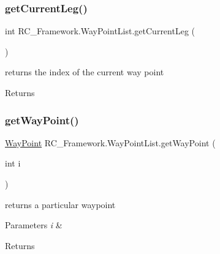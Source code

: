 \subsubsection{\texorpdfstring{get\+Current\+Leg()}{getCurrentLeg()}}
{\footnotesize\ttfamily int R\+C\+\_\+\+Framework.\+Way\+Point\+List.\+get\+Current\+Leg (\begin{DoxyParamCaption}{ }\end{DoxyParamCaption})}



returns the index of the current way point 

\begin{DoxyReturn}{Returns}

\end{DoxyReturn}
\mbox{\label{class_r_c___framework_1_1_way_point_list_aefb59feb76973b2a903d342618350896}} 
\subsubsection{\texorpdfstring{get\+Way\+Point()}{getWayPoint()}}
{\footnotesize\ttfamily \mbox{\hyperlink{class_r_c___framework_1_1_way_point}{Way\+Point}} R\+C\+\_\+\+Framework.\+Way\+Point\+List.\+get\+Way\+Point (\begin{DoxyParamCaption}\item[{int}]{i }\end{DoxyParamCaption})}



returns a particular waypoint 


\begin{DoxyParams}{Parameters}
{\em i} & \\
\hline
\end{DoxyParams}
\begin{DoxyReturn}{Returns}

\end{DoxyReturn}
\mbox{\label{class_r_c___framework_1_1_way_point_list_a4e5f6b4882fd8ad79fe45ff7ed5da4a1}} 
